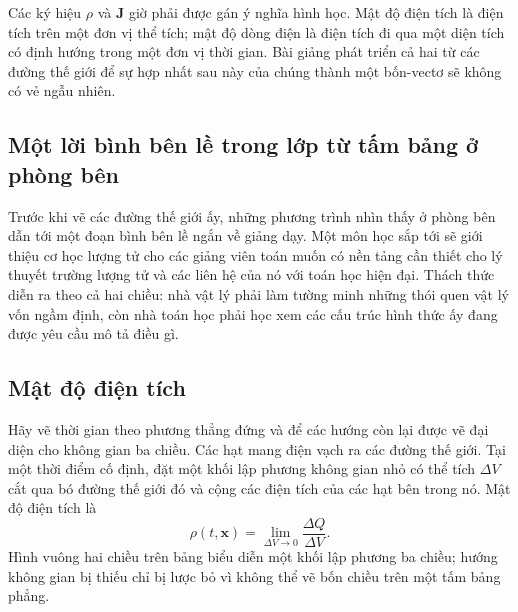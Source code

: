 Các ký hiệu \(\rho\) và \(\mathbf J\) giờ phải được gán ý nghĩa hình học. Mật độ điện tích là điện tích trên một đơn vị thể tích; mật độ dòng điện là điện tích đi qua một diện tích có định hướng trong một đơn vị thời gian. Bài giảng phát triển cả hai từ các đường thế giới để sự hợp nhất sau này của chúng thành một bốn-vectơ sẽ không có vẻ ngẫu nhiên.

\subsection{Một lời bình bên lề trong lớp từ tấm bảng ở phòng bên}

Trước khi vẽ các đường thế giới ấy, những phương trình nhìn thấy ở phòng bên dẫn tới một đoạn bình bên lề ngắn về giảng dạy. Một môn học sắp tới sẽ giới thiệu cơ học lượng tử cho các giảng viên toán muốn có nền tảng cần thiết cho lý thuyết trường lượng tử và các liên hệ của nó với toán học hiện đại. Thách thức diễn ra theo cả hai chiều: nhà vật lý phải làm tường minh những thói quen vật lý vốn ngầm định, còn nhà toán học phải học xem các cấu trúc hình thức ấy đang được yêu cầu mô tả điều gì.

\begin{classroomqa}
\end{classroomqa}

\subsection{Mật độ điện tích}

Hãy vẽ thời gian theo phương thẳng đứng và để các hướng còn lại được vẽ đại diện cho không gian ba chiều. Các hạt mang điện vạch ra các đường thế giới. Tại một thời điểm cố định, đặt một khối lập phương không gian nhỏ có thể tích \(\Delta V\) cắt qua bó đường thế giới đó và cộng các điện tích của các hạt bên trong nó. Mật độ điện tích là
\begin{equation}
\rho(t,\mathbf x)
=
\lim_{\Delta V\to0}
\frac{\Delta Q}{\Delta V}.
\label{eq:charge-density}
\end{equation}
Hình vuông hai chiều trên bảng biểu diễn một khối lập phương ba chiều; hướng không gian bị thiếu chỉ bị lược bỏ vì không thể vẽ bốn chiều trên một tấm bảng phẳng.

